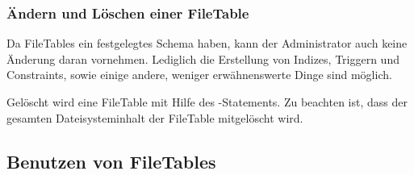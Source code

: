         \subsubsection{Ändern und Löschen einer FileTable}
          Da FileTables ein festgelegtes Schema haben, kann der Administrator
          auch keine Änderung daran vornehmen. Lediglich die Erstellung von
          Indizes, Triggern und Constraints, sowie einige andere, weniger
          erwähnenswerte Dinge sind möglich.
          
          Gelöscht wird eine FileTable mit Hilfe des -Statements. Zu beachten ist, dass der gesamten
          Dateisysteminhalt der FileTable mitgelöscht wird.            
      \subsection{Benutzen von FileTables}
